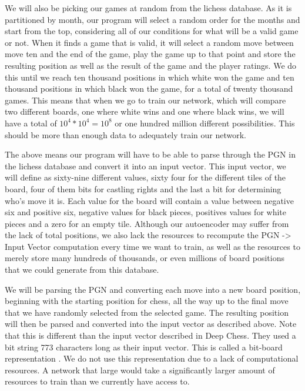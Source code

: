 \documentclass[12pt]{article}
\begin{document}
    We will also be picking our games at random from the lichess database. As it is partitioned by month, our program will select a random order for the months and start from the top, considering all of our conditions for what will be a valid game or not. When it finds a game that is valid, it will select a random move between move ten and the end of the game, play the game up to that point and store the resulting position as well as the result of the game and the player ratings. We do this until we reach ten thousand positions in which white won the game and ten thousand positions in which black won the game, for a total of twenty thousand games. This means that when we go to train our network, which will compare two different boards, one where white wins and one where black wins, we will have a total of $10^{4} * 10^{4} = 10^{8}$ or one hundred million different possibilities. This should be more than enough data to adequately train our network. 

    The above means our program will have to be able to parse through the PGN in the lichess database and convert it into an input vector. This input vector, we will define as sixty-nine different values, sixty four for the different tiles of the board, four of them bits for castling rights and the last a bit for determining who's move it is. Each value for the board will contain a value between negative six and positive six, negative values for black pieces, positives values for white pieces and a zero for an empty tile. Although our autoencoder may suffer from the lack of total positions, we also lack the resources to recompute the PGN -> Input Vector computation every time we want to train, as well as the resources to merely store many hundreds of thousands, or even millions of board positions that we could generate from this database.
    
    We will be parsing the PGN and converting each move into a new board position, beginning with the starting position for chess, all the way up to the final move that we have randomly selected from the selected game. The resulting position will then be parsed and converted into the input vector as described above. Note that this is different than the input vector described in Deep Chess. They used a bit string 773 characters long as their input vector. This is called a bit-board representation \cite{deepchess}. We do not use this representation due to a lack of computational resources. A network that large would take a significantly larger amount of resources to train than we currently have access to.
\end{document}
